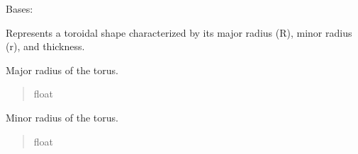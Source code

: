 \documentclass[letterpaper,10pt,english]{sphinxmanual}
\begin{document}
\begin{fulllineitems}
\label{\detokenize{src:src.Torus.Torus}}
\pysigstartsignatures
{}
\pysigstopsignatures
\sphinxAtStartPar
Bases: 

\sphinxAtStartPar
Represents a toroidal shape characterized by its major radius (R), minor radius (r), and thickness.

\begin{fulllineitems}
\label{\detokenize{src:src.Torus.Torus.R}}
\pysigstartsignatures
{}
\pysigstopsignatures
\sphinxAtStartPar
Major radius of the torus.
\begin{quote}\begin{description}
\sphinxAtStartPar
float

\end{description}\end{quote}

\end{fulllineitems}


\begin{fulllineitems}
\label{\detokenize{src:src.Torus.Torus.r}}
\pysigstartsignatures
{}
\pysigstopsignatures
\sphinxAtStartPar
Minor radius of the torus.
\begin{quote}\begin{description}
\sphinxAtStartPar
float

\end{description}\end{quote}

\end{fulllineitems}


\end{fulllineitems}
\end{document}
